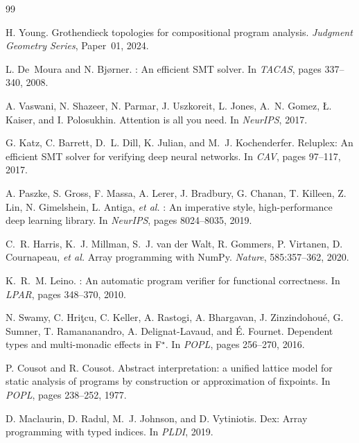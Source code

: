 \documentclass[11pt]{article}
\begin{document}
\begin{thebibliography}{99}

H. Young.
\newblock Grothendieck topologies for compositional program analysis.
\newblock \textit{Judgment Geometry Series}, Paper~01, 2024.

L. De~Moura and N. Bj{\o}rner.
: An efficient SMT solver.
\newblock In \textit{TACAS}, pages 337--340, 2008.

A. Vaswani, N. Shazeer, N. Parmar, J. Uszkoreit, L. Jones, A.~N. Gomez,
\L. Kaiser, and I. Polosukhin.
\newblock Attention is all you need.
\newblock In \textit{NeurIPS}, 2017.

G. Katz, C. Barrett, D.~L. Dill, K. Julian, and M.~J. Kochenderfer.
\newblock Reluplex: An efficient SMT solver for verifying deep neural networks.
\newblock In \textit{CAV}, pages 97--117, 2017.

A. Paszke, S. Gross, F. Massa, A. Lerer, J. Bradbury, G. Chanan,
T. Killeen, Z. Lin, N. Gimelshein, L. Antiga, \textit{et al.}
: An imperative style, high-performance deep learning
library.
\newblock In \textit{NeurIPS}, pages 8024--8035, 2019.

C.~R. Harris, K.~J. Millman, S.~J. van der Walt, R. Gommers,
P. Virtanen, D. Cournapeau, \textit{et al.}
\newblock Array programming with {NumPy}.
\newblock \textit{Nature}, 585:357--362, 2020.

K.~R.~M. Leino.
: An automatic program verifier for functional correctness.
\newblock In \textit{LPAR}, pages 348--370, 2010.

N. Swamy, C. Hri\c{t}cu, C. Keller, A. Rastogi, A. Bhargavan,
J. Zinzindohou\'{e}, G. Sumner, T. Ramananandro, A. Delignat-Lavaud,
and \'{E}. Fournet.
\newblock Dependent types and multi-monadic effects in {F$^{\star}$}.
\newblock In \textit{POPL}, pages 256--270, 2016.

P. Cousot and R. Cousot.
\newblock Abstract interpretation: a unified lattice model for static
analysis of programs by construction or approximation of fixpoints.
\newblock In \textit{POPL}, pages 238--252, 1977.

D. Maclaurin, D. Radul, M.~J. Johnson, and D. Vytiniotis.
\newblock Dex: Array programming with typed indices.
\newblock In \textit{PLDI}, 2019.


\end{thebibliography}
\end{document}
